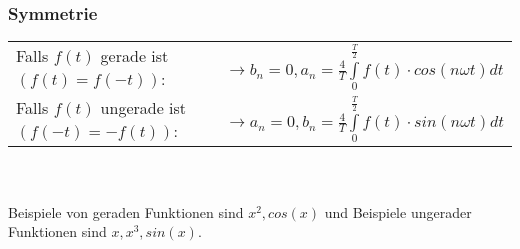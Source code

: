 \subsubsection{Symmetrie}
\begin{tabular}{ll}
  Falls $f(t)$ gerade ist $(f(t) = f(-t))$: &\ $\rightarrow b_{n} = 0, a_{n} = \frac{4}{T}\int\limits_{0}^{\frac{T}{2}} f(t) \cdot cos(n \omega t)dt$\\
  Falls $f(t)$ ungerade ist $(f(-t) = -f(t))$: &\ $\rightarrow a_{n} = 0, b_{n} = \frac{4}{T}\int\limits_{0}^{\frac{T}{2}} f(t) \cdot sin(n \omega t)dt$\\
\end{tabular}\\\\
Beispiele von geraden Funktionen sind $x^2, cos(x)$ und Beispiele ungerader Funktionen sind $x, x^3, sin(x)$.
